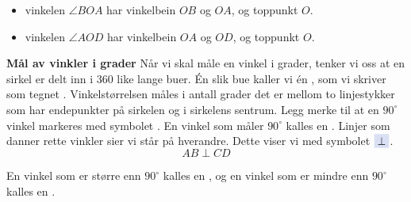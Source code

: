 \begin{itemize}
\item vinkelen $ \angle BOA $  har vinkelbein $ OB $ og $ OA $, og toppunkt $ O $.
\item vinkelen $ \angle AOD $  har vinkelbein $ OA $ og $ OD $, og toppunkt $ O $.	
\end{itemize}
\newpage
\textbf{Mål av vinkler i grader}\os
Når vi skal måle en vinkel i grader, tenker vi oss at en sirkel er delt inn i 360 like lange buer. Én slik bue kaller vi én , som vi skriver som tegnet \sym{$ ^\circ $}. Vinkelstørrelsen måles i antall grader det er mellom to linjestykker som har endepunkter på sirkelen og i sirkelens sentrum.
\newpage
Legg merke til at en $ 90^\circ $ vinkel markeres med symbolet \sym{$ \square $}. En vinkel som måler $ 90^\circ $ kalles en . Linjer som danner rette vinkler sier vi står  på hverandre. Dette viser vi med symbolet $ \sym{$ \perp $} $.
\[ AB\perp CD \]

En vinkel som er større enn $ 90^\circ $ kalles en , og en vinkel som er mindre enn $ 90^\circ $ kalles en .
 \vsk

